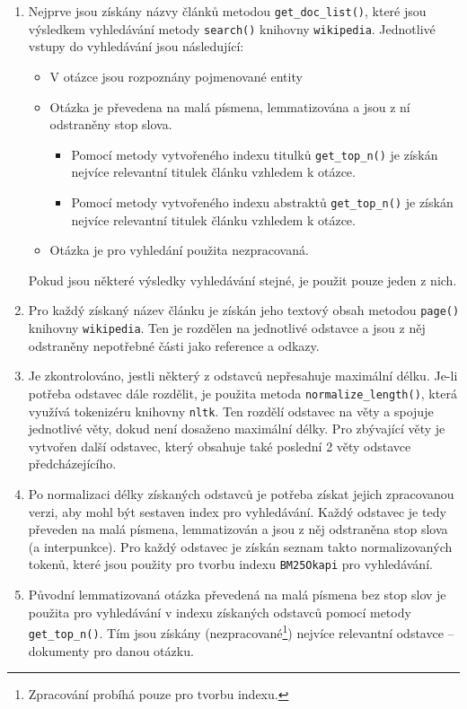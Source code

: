 \begin{enumerate}
    \item Nejprve jsou získány názvy článků metodou \texttt{get\_doc\_list()}, které jsou výsledkem vyhledávání metody \texttt{search()} knihovny \texttt{wikipedia}. Jednotlivé vstupy do vyhledávání jsou následující:
    \begin{itemize}
        \item V otázce jsou rozpoznány pojmenované entity
        \item Otázka je převedena na malá písmena, lemmatizována a jsou z ní odstraněny stop slova.
        \begin{itemize}
            \item Pomocí metody vytvořeného indexu titulků \texttt{get\_top\_n()} je získán nejvíce relevantní titulek článku vzhledem k otázce.
            \item Pomocí metody vytvořeného indexu abstraktů \texttt{get\_top\_n()} je získán nejvíce relevantní titulek článku vzhledem k otázce.
        \end{itemize}
        \item Otázka je pro vyhledání použita nezpracovaná.
    \end{itemize}
    Pokud jsou některé výsledky vyhledávání stejné, je použit pouze jeden z nich.
    
    \item Pro každý získaný název článku je získán jeho textový obsah metodou \texttt{page()} kni\-hovny \texttt{wikipedia}. Ten je rozdělen na jednotlivé odstavce a jsou z něj odstraněny nepotřebné části jako reference a odkazy.
    
    \item Je zkontrolováno, jestli některý z odstavců nepřesahuje maximální délku. Je-li potřeba odstavec dále rozdělit, je použita metoda \texttt{normalize\_length()}, která využívá tokenizéru knihovny \texttt{nltk}. Ten rozdělí odstavec na věty a spojuje jednotlivé věty, dokud není dosaženo maximální délky. Pro zbývající věty je vytvořen další odstavec, který obsahuje také poslední 2 věty odstavce předcházejícího.
    
    \item Po normalizaci délky získaných odstavců je potřeba získat jejich zpracovanou verzi, aby mohl být sestaven index pro vyhledávání. Každý odstavec je tedy převeden na malá písmena, lemmatizován a jsou z něj odstraněna stop slova (a interpunkce). Pro každý odstavec je získán seznam takto normalizovaných tokenů, které jsou použity pro tvorbu indexu \texttt{BM25Okapi} pro vyhledávání.
    
    \item Původní lemmatizovaná otázka převedená na malá písmena bez stop slov je použita pro vyhledávání v indexu získaných odstavců pomocí metody \texttt{get\_top\_n()}. Tím jsou získány (nezpracované\footnote{Zpracování probíhá pouze pro tvorbu indexu.}) nejvíce relevantní odstavce -- dokumenty pro danou otázku.
\end{enumerate}
\pagebreak
